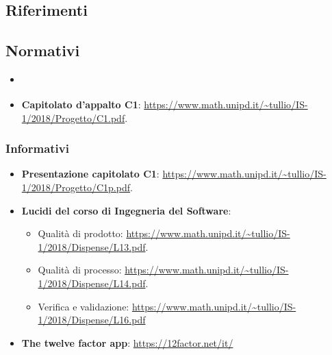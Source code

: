     \subsection{Riferimenti}
	
	\subsection{Normativi}
    \begin{itemize}
    	\item \textbf{\textit{\NdPv}}
    	\item \textbf{Capitolato d'appalto C1}: \url{https://www.math.unipd.it/~tullio/IS-1/2018/Progetto/C1.pdf}.
    \end{itemize}
    
    \subsubsection{Informativi}
    \begin{itemize}
    	\item \textbf{Presentazione capitolato C1}: \url{https://www.math.unipd.it/~tullio/IS-1/2018/Progetto/C1p.pdf}.
    	\item \textbf{Lucidi del corso di Ingegneria del Software}:
    	
    	\begin{itemize}
    		\item Qualità di prodotto: \url{https://www.math.unipd.it/~tullio/IS-1/2018/Dispense/L13.pdf}.
    		\item Qualità di processo: \url{https://www.math.unipd.it/~tullio/IS-1/2018/Dispense/L14.pdf}.
    		\item Verifica e validazione:
    		\url{https://www.math.unipd.it/~tullio/IS-1/2018/Dispense/L16.pdf}
    	\end{itemize}
    	\item \textbf{The twelve factor app}:
    	\url{https://12factor.net/it/}
    \end{itemize}